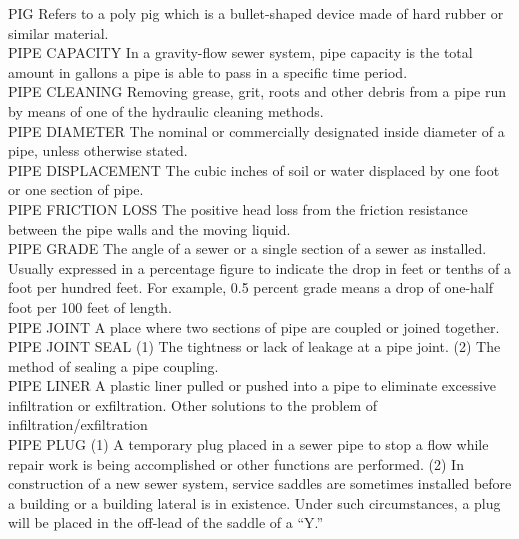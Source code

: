 PIG
Refers to a poly pig which is a bullet-shaped device made of hard rubber or similar material. 
\vspace{0.3cm}\\
PIPE CAPACITY
In a gravity-flow sewer system, pipe capacity is the total amount in gallons a pipe is able to pass in a specific time period. 
\vspace{0.3cm}\\
PIPE CLEANING
Removing grease, grit, roots and other debris from a pipe run by means of one of the hydraulic cleaning methods. 
\vspace{0.3cm}\\
PIPE DIAMETER
The nominal or commercially designated inside diameter of a pipe, unless otherwise stated. 
\vspace{0.3cm}\\
PIPE DISPLACEMENT
The cubic inches of soil or water displaced by one foot or one section of pipe. 
\vspace{0.3cm}\\
PIPE FRICTION LOSS
The positive head loss from the friction resistance between the pipe walls and the moving liquid.
\vspace{0.3cm}\\
PIPE GRADE
The angle of a sewer or a single section of a sewer as installed. Usually expressed in a percentage figure to indicate the drop in feet or tenths of a foot per hundred feet. For example, 0.5 percent grade means a drop of one-half foot per 100 feet of length. 
\vspace{0.3cm}\\
PIPE JOINT
A place where two sections of pipe are coupled or joined together. 
\vspace{0.3cm}\\
PIPE JOINT SEAL
(1) The tightness or lack of leakage at a pipe joint. (2) The method of sealing a pipe coupling. 
\vspace{0.3cm}\\
PIPE LINER
A plastic liner pulled or pushed into a pipe to eliminate excessive infiltration or exfiltration. Other solutions to the problem of infiltration/exfiltration 
\vspace{0.3cm}\\
PIPE PLUG
(1) A temporary plug placed in a sewer pipe to stop a flow while repair work is being accomplished or other functions are performed. (2) In construction of a new sewer system, service saddles are sometimes installed before a building or a building lateral is in existence. Under such circumstances, a plug will be placed in the off-lead of the saddle of a “Y.” 

